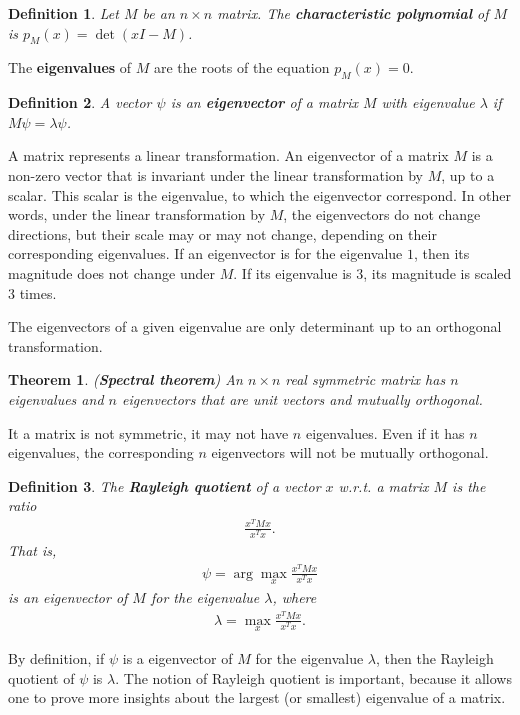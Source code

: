 \documentclass[]{article}
\newtheorem{theorem}{Theorem}[section]
\newtheorem{definition}{Definition}[section] %
\begin{document}
	\begin{definition}
		Let $M$ be an $n\times n$ matrix. The \textbf{characteristic polynomial} of $M$ is $p_M(x)=\det (xI - M)$.
	\end{definition}
	The \textbf{eigenvalues} of $M$ are the roots of the equation $p_M(x)=0$.
	
	\begin{definition}
		A vector $\psi$ is an \textbf{eigenvector} of a matrix $M$ with eigenvalue $\lambda$ if $M\psi=\lambda \psi$.
	\end{definition}
	A matrix represents a linear transformation. An eigenvector of a matrix $M$ is a non-zero vector that is invariant under the linear transformation by $M$, up to a scalar. This scalar is the eigenvalue, to which the eigenvector correspond. In other words, under the linear transformation by $M$, the eigenvectors do not change directions, but their scale may or may not change, depending on their corresponding eigenvalues. If an eigenvector is for the eigenvalue $1$, then its magnitude does not change under $M$. If its eigenvalue is $3$, its magnitude is scaled 3 times. 
	
	The eigenvectors of a given eigenvalue are only determinant up to an orthogonal transformation. 
	
	\begin{theorem} (\textbf{Spectral theorem})
		An $n \times n$ real symmetric matrix has $n$ eigenvalues and $n$ eigenvectors that are unit vectors and mutually orthogonal.
	\end{theorem}
	It a matrix is not symmetric, it may not have $n$ eigenvalues. Even if it has $n$ eigenvalues, the corresponding $n$ eigenvectors will not be mutually orthogonal. 
	
	\begin{definition}
		The \textbf{Rayleigh quotient} of a vector $x$ w.r.t. a matrix $M$ is the ratio 
		\begin{align*}
		\frac{x^T M x}{x^T x}. 
		\end{align*}
		That is, 
		\begin{align*}
		\psi = \arg\max_{x} \frac{x^T M x}{x^T x}
		\end{align*}
		is an eigenvector of $M$ for the eigenvalue $\lambda$, where 
		\begin{align*}
		\lambda = \max_{x} \frac{x^T M x}{x^T x}.
		\end{align*}
	\end{definition}
	By definition, if $\psi$ is a eigenvector of $M$ for the eigenvalue $\lambda$, then the Rayleigh quotient of $\psi$ is $\lambda$. The notion of Rayleigh quotient is important, because it allows one to prove more insights about the largest (or smallest) eigenvalue of a matrix. 
	
\end{document}
